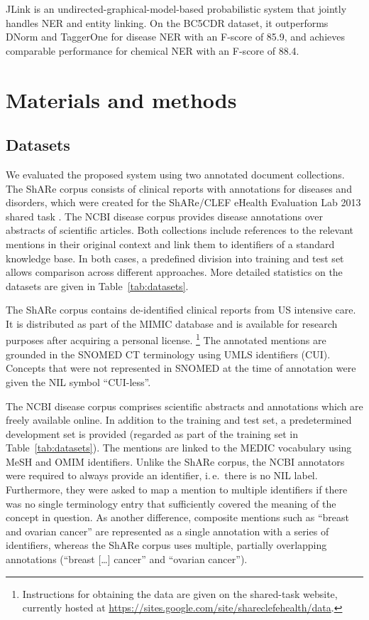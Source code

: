 \documentclass{bioinfo}
\newcommand{\url}[1]{\href{#1}{#1}}
\newcommand{\ie}{i.\,e.\ }
\begin{document}
JLink \citep{ter-horst-et-al:2017:LDK} is an undirected-graphical-model-based probabilistic system that jointly handles NER and entity linking.
On the BC5CDR dataset, it outperforms DNorm and TaggerOne for disease NER with an F-score of 85.9, and achieves comparable performance for chemical NER with an F-score of 88.4.



\section{Materials and methods}

\subsection{Datasets}

We evaluated the proposed system using two annotated document collections.
The ShARe corpus consists of clinical reports with annotations for diseases and disorders, which were created for the ShARe/CLEF eHealth Evaluation Lab 2013 shared task \citep{pradhan-et-al:2013:CLEF}.
The NCBI disease corpus \citep{islamaj-dogan-et-al:2014} provides disease annotations over abstracts of scientific articles.
Both collections include references to the relevant mentions in their original context and link them to identifiers of a standard knowledge base.
In both cases, a predefined division into training and test set allows comparison across different approaches.
More detailed statistics on the datasets are given in Table~\ref{tab:datasets}.

The ShARe corpus contains de-identified clinical reports from US intensive care.
It is distributed as part of the MIMIC database  %
and is available for research purposes after acquiring a personal license.%
\footnote{Instructions for obtaining the data are given on the shared-task website, currently hosted at \url{https://sites.google.com/site/shareclefehealth/data}.}
The annotated mentions are grounded in the SNOMED CT terminology  %
using UMLS  %
identifiers (CUI).
Concepts that were not represented in SNOMED at the time of annotation were given the NIL symbol “CUI-less”.

The NCBI disease corpus comprises scientific abstracts and annotations which are freely available online.
In addition to the training and test set, a predetermined development set is provided (regarded as part of the training set in Table~\ref{tab:datasets}).
The mentions are linked to the MEDIC vocabulary  %
using MeSH  %
and OMIM  %
identifiers.
Unlike the ShARe corpus, the NCBI annotators were required to always provide an identifier, \ie there is no NIL label.
Furthermore, they were asked to map a mention to multiple identifiers if there was no single terminology entry that sufficiently covered the meaning of the concept in question.
As another difference, composite mentions such as “breast and ovarian cancer” are represented as a single annotation with a series of identifiers, whereas the ShARe corpus uses multiple, partially overlapping annotations (“breast [\dots] cancer” and “ovarian cancer”).
\end{document}
